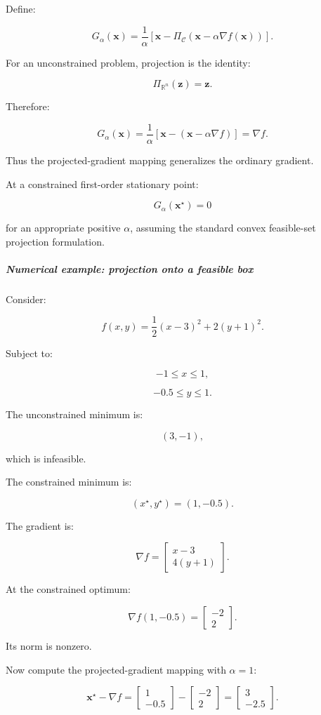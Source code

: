Define:

\[
\boxed{ G_\alpha(\mathbf x)= \frac1\alpha \left[ \mathbf x- \Pi_{\mathcal C} (\mathbf x-\alpha\nabla f(\mathbf x)) \right] }.
\]

For an unconstrained problem, projection is the identity:

\[
\Pi_{\mathbb R^n}(\mathbf z)=\mathbf z.
\]

Therefore:

\[
G_\alpha(\mathbf x) = \frac1\alpha[ \mathbf x-(\mathbf x-\alpha\nabla f) ] = \nabla f.
\]

Thus the projected-gradient mapping generalizes the ordinary gradient.

At a constrained first-order stationary point:

\[
\boxed{ G_\alpha(\mathbf x^\star)=0 }
\]

for an appropriate positive \(\alpha\), assuming the standard convex feasible-set projection formulation.

\subparagraph{Numerical example: projection onto a feasible box}\label{numerical-example-projection-onto-a-feasible-box}

Consider:

\[
f(x,y)= \frac12(x-3)^2+2(y+1)^2.
\]

Subject to:

\[
-1\le x\le1,
\]

\[
-0.5\le y\le1.
\]

The unconstrained minimum is:

\[
(3,-1),
\]

which is infeasible.

The constrained minimum is:

\[
\boxed{ (x^\star,y^\star)=(1,-0.5) }.
\]

The gradient is:

\[
\nabla f= \begin{bmatrix} x-3\\ 4(y+1) \end{bmatrix}.
\]

At the constrained optimum:

\[
\nabla f(1,-0.5)= \begin{bmatrix} -2\\2 \end{bmatrix}.
\]

Its norm is nonzero.

Now compute the projected-gradient mapping with \(\alpha=1\):

\[
\mathbf x^\star-\nabla f= \begin{bmatrix} 1\\-0.5 \end{bmatrix} - \begin{bmatrix} -2\\2 \end{bmatrix} = \begin{bmatrix} 3\\-2.5 \end{bmatrix}.
\]

